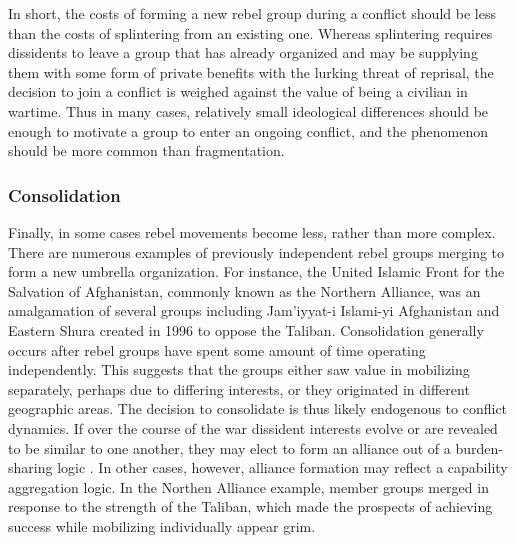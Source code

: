 
In short, the costs of forming a new rebel group during a conflict should be less than the costs of splintering from an existing one. Whereas splintering requires dissidents to leave a group that has already organized and may be supplying them with some form of private benefits with the lurking threat of reprisal, the decision to join a conflict is weighed against the value of being a civilian in wartime. Thus in many cases, relatively small ideological differences should be enough to motivate a group to enter an ongoing conflict, and the phenomenon should be more common than fragmentation.


\subsubsection{Consolidation}

Finally, in some cases rebel movements become less, rather than more complex. There are numerous examples of previously independent rebel groups merging to form a new umbrella organization. For instance, the United Islamic Front for the Salvation of Afghanistan, commonly known as the Northern Alliance, was an amalgamation of several groups including Jam'iyyat-i Islami-yi Afghanistan and Eastern Shura created in 1996 to oppose the Taliban. Consolidation generally occurs after rebel groups have spent some amount of time operating independently. This suggests that the groups either saw value in mobilizing separately, perhaps due to differing interests, or they originated in different geographic areas. The decision to consolidate is thus likely endogenous to conflict dynamics. If over the course of the war dissident interests evolve or are revealed to be similar to one another, they may elect to form an alliance out of a burden-sharing logic \citep{Sandler1980}. In other cases, however, alliance formation may reflect a capability aggregation logic. In the Northen Alliance example, member groups merged in response to the strength of the Taliban, which made the prospects of achieving success while mobilizing individually appear grim.
